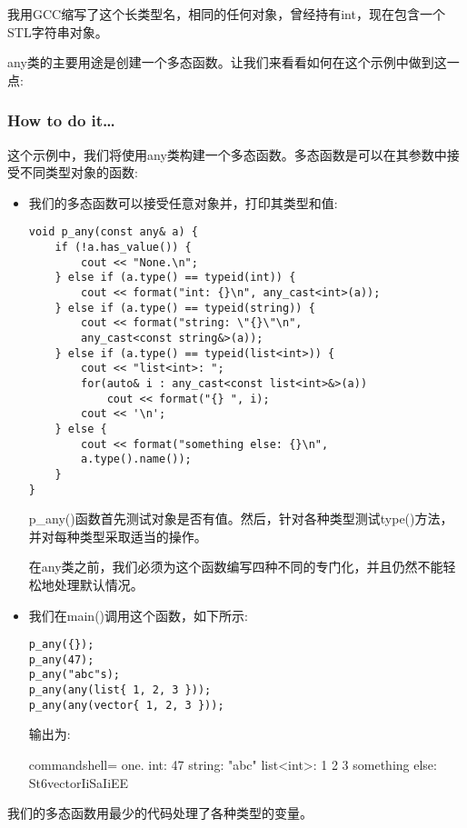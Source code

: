 我用GCC缩写了这个长类型名，相同的任何对象，曾经持有int，现在包含一个STL字符串对象。

any类的主要用途是创建一个多态函数。让我们来看看如何在这个示例中做到这一点:

\subsubsection{How to do it…}

这个示例中，我们将使用any类构建一个多态函数。多态函数是可以在其参数中接受不同类型对象的函数:

\begin{itemize}
\item 
我们的多态函数可以接受任意对象并，打印其类型和值:

\begin{lstlisting}[style=styleCXX]
void p_any(const any& a) {
	if (!a.has_value()) {
		cout << "None.\n";
	} else if (a.type() == typeid(int)) {
		cout << format("int: {}\n", any_cast<int>(a));
	} else if (a.type() == typeid(string)) {
		cout << format("string: \"{}\"\n",
		any_cast<const string&>(a));
	} else if (a.type() == typeid(list<int>)) {
		cout << "list<int>: ";
		for(auto& i : any_cast<const list<int>&>(a))
			cout << format("{} ", i);
		cout << '\n';
	} else {
		cout << format("something else: {}\n",
		a.type().name());
	}
}
\end{lstlisting}

p\_any()函数首先测试对象是否有值。然后，针对各种类型测试type()方法，并对每种类型采取适当的操作。

在any类之前，我们必须为这个函数编写四种不同的专门化，并且仍然不能轻松地处理默认情况。

\item 
我们在main()调用这个函数，如下所示:

\begin{lstlisting}[style=styleCXX]
p_any({});
p_any(47);
p_any("abc"s);
p_any(any(list{ 1, 2, 3 }));
p_any(any(vector{ 1, 2, 3 }));
\end{lstlisting}

输出为:

\begin{tcblisting}{commandshell={}}
one.
int: 47
string: "abc"
list<int>: 1 2 3
something else: St6vectorIiSaIiEE
\end{tcblisting}

\end{itemize}

我们的多态函数用最少的代码处理了各种类型的变量。

